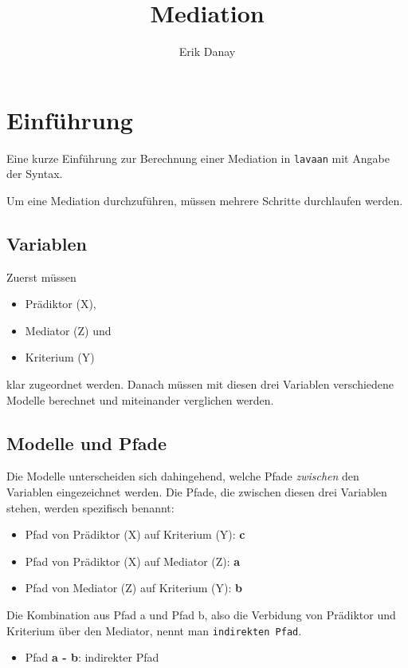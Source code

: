 \documentclass[a4paper]{article}\usepackage[]{graphicx}\usepackage[]{color}
\begin{document}
\title {Mediation}
\author{Erik Danay}

\maketitle
\section{Einf\"uhrung}
Eine kurze Einf\"uhrung zur Berechnung einer Mediation in
\texttt{lavaan} mit Angabe der Syntax. \par
Um eine Mediation durchzuf\"uhren, m\"ussen mehrere Schritte durchlaufen werden. 
\subsection{Variablen}
Zuerst m\"ussen \begin{itemize}
  \item Pr\"adiktor (X),   \item 
  Mediator (Z) und   \item 
  Kriterium (Y) 
\end{itemize}
klar zugeordnet werden.
Danach m\"ussen mit diesen drei Variablen verschiedene Modelle berechnet und miteinander verglichen werden. \par

\subsection{Modelle und Pfade}
Die Modelle unterscheiden sich dahingehend, welche Pfade \textit{zwischen} den Variablen eingezeichnet werden.
Die Pfade, die zwischen diesen drei Variablen stehen, werden spezifisch benannt:
\begin{itemize}
  \item Pfad von Pr\"adiktor (X) auf Kriterium (Y): \textbf{c
}  \item Pfad von Pr\"adiktor (X) auf Mediator (Z): \textbf{a}
\item Pfad von Mediator (Z) auf Kriterium (Y): \textbf{b}
\end{itemize}

Die Kombination aus Pfad a und Pfad b, also die Verbidung von Pr\"adiktor und Kriterium \"uber den Mediator, nennt man \texttt{indirekten Pfad}.
\begin{itemize}
  \item Pfad \textbf{a - b}: indirekter Pfad
\end{itemize}
\end{document}
